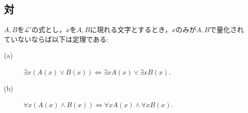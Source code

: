 \subsection{対}
	\begin{screen}
		\begin{logicalthm}[量化記号の性質(ロ)]\label{logicalthm:properties_of_quantifiers_2}
			$A,B$を$\mathcal{L}'$の式とし，$x$を$A,B$に現れる文字とするとき，$x$のみが$A,B$で量化されていないならば以下は定理である:
			\begin{description}
				\item[(a)] $\exists x ( A(x) \vee B(x) ) \Longleftrightarrow \exists x A(x) \vee \exists x B(x)$.
				
				\item[(b)] $\forall x ( A(x) \wedge B(x) ) \Longleftrightarrow \forall x A(x) \wedge \forall x B(x)$.
			\end{description}
		\end{logicalthm}
	\end{screen}
	
